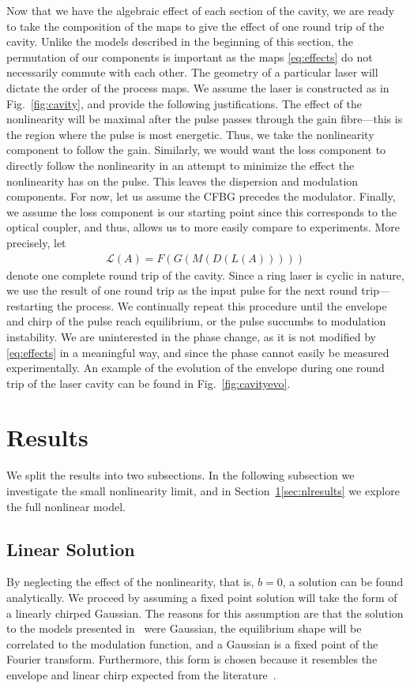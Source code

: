 \documentclass[9pt,twocolumn,twoside]{osajnl}
\begin{document}
Now that we have the algebraic effect of each section of the cavity, we are ready to take the composition of the maps to give the effect of one round trip of the cavity. Unlike the models described in the beginning of this section, the permutation of our components is important as the maps \eqref{eq:effects} do not necessarily commute with each other. The geometry of a particular laser will dictate the order of the process maps. We assume the laser is constructed as in Fig.~\ref{fig:cavity}, and provide the following justifications. The effect of the nonlinearity will be maximal after the pulse passes through the gain fibre---this is the region where the pulse is most energetic. Thus, we take the nonlinearity component to follow the gain. Similarly, we would want the loss component to directly follow the nonlinearity in an attempt to minimize the effect the nonlinearity has on the pulse. This leaves the dispersion and modulation components. For now, let us assume the CFBG precedes the modulator. Finally, we assume the loss component is our starting point since this corresponds to the optical coupler, and thus, allows us to more easily compare to experiments. More precisely, let
\begin{align}
	\mathcal{L}(A) = F(G(M(D(L(A)))))
	\label{eq:order}
\end{align}
denote one complete round trip of the cavity. Since a ring laser is cyclic in nature, we use the result of one round trip as the input pulse for the next round trip---restarting the process. We continually repeat this procedure until the envelope and chirp of the pulse reach equilibrium, or the pulse succumbs to modulation instability. We are uninterested in the phase change, as it is not modified by \eqref{eq:effects} in a meaningful way, and since the phase cannot easily be measured experimentally. An example of the evolution of the envelope during one round trip of the laser cavity can be found in Fig.~\ref{fig:cavityevo}.

\section{Results}
\label{sec:results}
We split the results into two subsections. In the following subsection we investigate the small nonlinearity limit, and in Section~\ref{sec:results}\ref{sec:nlresults} we explore the full nonlinear model.

\subsection{Linear Solution}
By neglecting the effect of the nonlinearity, that is, $b = 0$, a solution can be found analytically. We proceed by assuming a fixed point solution will take the form of a linearly chirped Gaussian. The reasons for this assumption are that the solution to the models presented in~\cite{cutler1955, siegman1969, kuizenga1970a, martinez1984, martinez1985} were Gaussian, the equilibrium shape will be correlated to the modulation function, and a Gaussian is a fixed point of the Fourier transform. Furthermore, this form is chosen because it resembles the envelope and linear chirp expected from the literature~\cite{burgoyne2014, haus1975, haus1996, haus2000, usechak2005}.
\end{document}
